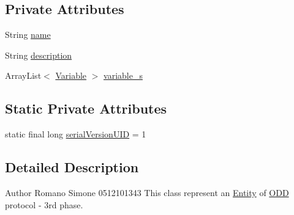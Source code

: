 \subsection*{Private Attributes}
\begin{DoxyCompactItemize}
\item 
String \hyperlink{classit_1_1isislab_1_1masonhelperdocumentation_1_1_o_d_d_1_1_entity_aa635443223d2902214dfb197aa7e17f0}{name}
\item 
String \hyperlink{classit_1_1isislab_1_1masonhelperdocumentation_1_1_o_d_d_1_1_entity_a28e55723c0334f36c4296ff8b891daa9}{description}
\item 
Array\-List$<$ \hyperlink{classit_1_1isislab_1_1masonhelperdocumentation_1_1_o_d_d_1_1_variable}{Variable} $>$ \hyperlink{classit_1_1isislab_1_1masonhelperdocumentation_1_1_o_d_d_1_1_entity_a32a30da644c3d9ef1a3d04b6b5b8346f}{variable\-\_\-s}
\end{DoxyCompactItemize}
\subsection*{Static Private Attributes}
\begin{DoxyCompactItemize}
\item 
static final long \hyperlink{classit_1_1isislab_1_1masonhelperdocumentation_1_1_o_d_d_1_1_entity_a5bf947b1ed7e18b5b727b2699f4df3cd}{serial\-Version\-U\-I\-D} = 1
\end{DoxyCompactItemize}


\subsection{Detailed Description}
\begin{DoxyAuthor}{Author}
Romano Simone 0512101343 This class represent an \hyperlink{classit_1_1isislab_1_1masonhelperdocumentation_1_1_o_d_d_1_1_entity}{Entity} of \hyperlink{classit_1_1isislab_1_1masonhelperdocumentation_1_1_o_d_d_1_1_o_d_d}{O\-D\-D} protocol -\/ 3rd phase. 
\end{DoxyAuthor}


